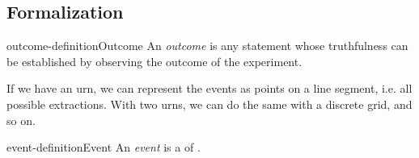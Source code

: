 \documentclass[preview]{standalone}
\begin{document}
\subsection{Formalization}

\begin{snippetdefinition}{outcome-definition}{Outcome}
    An \emph{outcome} is any statement
    whose truthfulness can be established
    by observing the outcome of the experiment.
\end{snippetdefinition}

\begin{plainhtml}
    If we have an urn, we can represent
    the events as points on a line segment, i.e. all possible extractions.
    With two urns, we can do the same with a discrete grid, and so on.
\end{plainhtml}

\begin{snippetdefinition}{event-definition}{Event}
    An \emph{event} is a \set of \outcome[outcomes].
\end{snippetdefinition}
\end{document}
